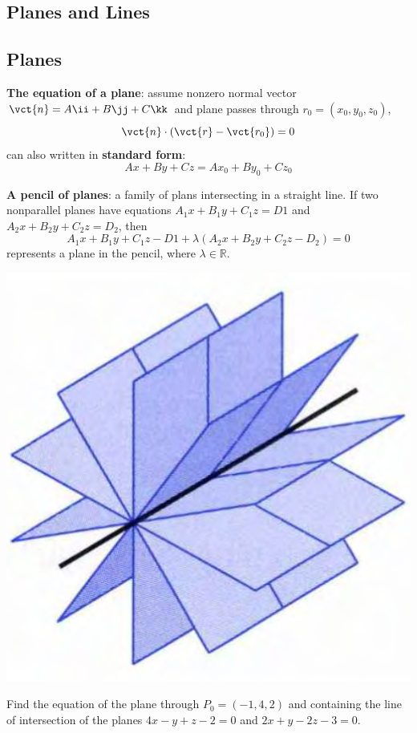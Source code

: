 \begin{spacing}{1.3}
    \section{Planes and Lines}

    \subsection{Planes}

    {\bf The equation of a plane}: assume nonzero normal vector 
    $\vct{n}=A\ii+B\jj+C\kk$ and plane passes through $r_0=(x_0,y_0,z_0)$,
    $$\vct{n}\cdot (\vct{r}-\vct{r_0})=0$$
    can also written in {\bf standard form}: 
    $$Ax+By+Cz=Ax_0+By_0+Cz_0$$

    {\bf A pencil of planes}: a family of plans intersecting in a straight line.
    If two nonparallel planes have equations $A_1x+B_1y+C_1z=D1$ and 
    $A_2x+B_2y+C_2z=D_2$, then 
    $$A_1x+B_1y+C_1z-D1+\lambda(A_2x+B_2y+C_2z-D_2)=0$$
    represents a plane in the pencil, where $\lambda\in \mathbb{R}$.
    \begin{center}
        \includegraphics[scale=0.4]{images/Ch10-pencils-of-planes.png}
    \end{center}

    \eg Find the equation of the plane through $P_0=(-1,4,2)$ and 
    containing the line of intersection of the planes 
    $4x-y+z-2=0$ and $2x+y-2z-3=0$.


\end{spacing}

